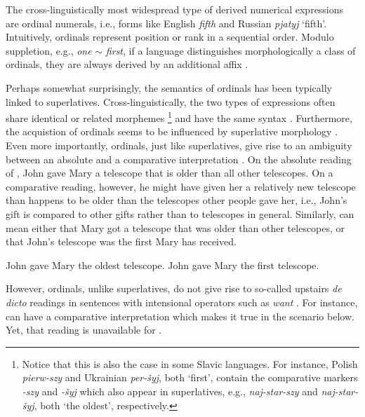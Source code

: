 \documentclass[output=paper]{langscibook}
\begin{document}
	The cross-linguistically most widespread type of derived numerical expressions are ordinal numerals, i.e., forms like English \textit{fifth} and Russian \textit{pjatyj} `fifth'. Intuitively, ordinals represent position or rank in a sequential order. Modulo suppletion, e.g., \textit{one} $\sim$ \textit{first}, if a language distinguishes morphologically a class of ordinals, they are always derived by an additional affix \citep{stolz_veselinova2013ordinal}. 
 
	Perhaps somewhat surprisingly, the semantics of ordinals has been typically linked to superlatives. Cross-linguistically, the two types of expressions often share identical or related morphemes \citep{hurford1987language,veselinova1998suppletion}\footnote{Notice that this is also the case in some Slavic languages. For instance, Polish \textit{pierw-szy} and Ukrainian \textit{per-šyj}, both `first', contain the comparative markers \textit{-szy} and \textit{-šyj} which also appear in superlatives, e.g., \textit{naj-star-szy} and \textit{naj-star-šyj}, both `the oldest', respectively.} and have the same syntax \citep{barbiers2007indefinite}. Furthermore, the acquistion of ordinals seems to be influenced by superlative morphology \citep{meyer_et-al2018ordinals}. Even more importantly, ordinals, just like superlatives, give rise to an ambiguity between an absolute and a comparative interpretation \citep{bhatt2006covert,sharvit2010infinitival}. On the absolute reading of , John gave Mary a telescope that is older than all other telescopes. On a comparative reading, however, he might have given her a relatively new telescope than happens to be older than the telescopes other people gave her, i.e., John's gift is compared to other gifts rather than to telescopes in general. Similarly,  can mean either that Mary got a telescope that was older than other telescopes, or that John's telescope was the first Mary has received.
	
	\ea\label{ex:superlatives-ordinals} \ea John gave Mary the oldest telescope.\label{ex:superlatives}
	\ex John gave Mary the first telescope. \hfill\label{ex:ordinals}
	\z
	\z

\noindent However, ordinals, unlike superlatives, do not give rise to so-called upstairs \textit{de dicto} readings in sentences with intensional operators such as \textit{want} \citep{bylinina_et-al2015insitu}. For instance,  can have a comparative interpretation which makes it true in the scenario below. Yet, that reading is unavailable for .
	
\end{document}
